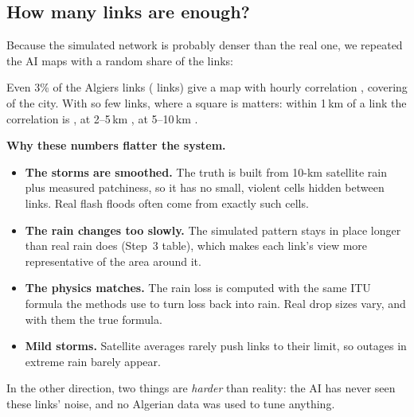 \subsection{How many links are enough?}
\label{sec:p4_density}
Because the simulated network is probably denser than the real one, we repeated the AI maps with a random share of the
links:
\begin{center}
\end{center}
Even 3\% of the Algiers links (\PfourAlgSparseN{} links) give a map with hourly correlation \PfourAlgAISparseR{}, covering
\PfourAlgAISparseCover{} of the city. With so few links, where a square is matters: within 1\,km of a link the correlation is
\PfourAlgDistA, at 2--5\,km \PfourAlgDistC, at 5--10\,km \PfourAlgDistD.

\begin{careful}
\textbf{Why these numbers flatter the system.}
\begin{itemize}
\item \textbf{The storms are smoothed.} The truth is built from 10-km satellite rain plus measured patchiness, so it has no
small, violent cells hidden between links. Real flash floods often come from exactly such cells.
\item \textbf{The rain changes too slowly.} The simulated pattern stays in place longer than real rain does (Step~3
table), which makes each link's view more representative of the area around it.
\item \textbf{The physics matches.} The rain loss is computed with the same ITU formula the methods use to turn loss back
into rain. Real drop sizes vary, and with them the true formula.
\item \textbf{Mild storms.} Satellite averages rarely push links to their limit, so outages in extreme rain barely appear.
\end{itemize}
In the other direction, two things are \emph{harder} than reality: the AI has never seen these links' noise, and no
Algerian data was used to tune anything.
\end{careful}


